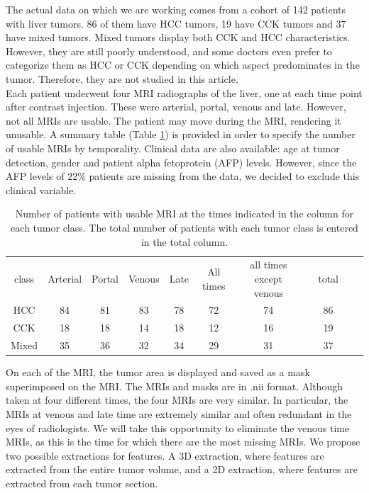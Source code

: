 \documentclass[preprint,12pt]{elsarticle}
\begin{document}
\noindent The actual data on which we are working comes from a cohort of 142 patients with liver tumors. 86 of them have HCC tumors, 19 have CCK tumors and 37 have mixed tumors. Mixed tumors display both CCK and HCC characteristics. However, they are still poorly understood, and some doctors even prefer to categorize them as HCC or CCK depending on which aspect predominates in the tumor. Therefore, they are not studied in this article.\\
\indent Each patient underwent four MRI radiographs of the liver, one at each time point after contrast injection. These were arterial, portal, venous and late. However, not all MRIs are usable. The patient may move during the MRI, rendering it unusable. A summary table (Table \ref{tab:nb_tumeurs}) is provided in order to specify the number of usable MRIs by temporality. Clinical data are also available: age at tumor detection, gender and patient alpha fetoprotein (AFP) levels. However, since the AFP levels of $22\%$ patients are missing from the data, we decided to exclude this clinical variable.\\
\begin{table}[tbp]
    \centering
    \caption{Number of patients with usable MRI at the times indicated in the column for each tumor class. The total number of patients with each tumor class is entered in the total column.}
    \label{tab:nb_tumeurs}
    \begin{tabular}{|c|c|c|c|c|c|c|c|c|c|c|}
        \cline{1-7} \cline{9-9}
        class & Arterial & Portal & Venous & Late & All times & all times except venous& & total \\
        \cline{1-7} \cline{9-9}
        HCC & 84 & 81 & 83 & 78 & 72 & 74 & & 86\\
        \cline{1-7} \cline{9-9}
        CCK & 18 & 18 & 14 & 18 & 12 & 16 & & 19\\
        \cline{1-7} \cline{9-9}
        Mixed & 35 & 36 & 32 & 34 & 29 & 31 & & 37\\
        \cline{1-7} \cline{9-9}
    \end{tabular}
\end{table}
\indent On each of the MRI, the tumor area is displayed and saved as a mask superimposed on the MRI. The MRIs and masks are in .nii format. Although taken at four different times, the four MRIs are very similar. In particular, the MRIs at venous and late time are extremely similar and often redundant in the eyes of radiologists. We will take this opportunity to eliminate the venous time MRIs, as this is the time for which there are the most missing MRIs.
We propose two possible extractions for features. A 3D extraction, where features are extracted from the entire tumor volume, and a 2D extraction, where features are extracted from each tumor section. 
\end{document}
